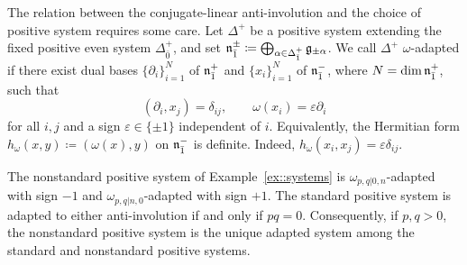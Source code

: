 The relation between the conjugate-linear anti-involution and the choice of positive system requires some care. Let $\Delta^{+}$ be a positive system extending the fixed positive even system $\Delta_{\bar0}^{+}$, and set
${\mathfrak{n}}_{\bar1}^{\pm}
\coloneqq
\bigoplus_{\alpha\in\Delta_{\bar1}^{+}}
{\mathfrak{g}}_{\pm\alpha}$. 
We call $\Delta^{+}$ $\omega$-adapted if there exist dual bases
$\{\partial_i\}_{i=1}^{N}$ of ${\mathfrak{n}}_{\bar1}^{+}$ and
$\{x_i\}_{i=1}^{N}$ of ${\mathfrak{n}}_{\bar1}^{-}$, where
$N=\dim{\mathfrak{n}}_{\bar1}^{+}$, such that
\begin{equation}
(\partial_i,x_j)=\delta_{ij},
\qquad
\omega(x_i)=\varepsilon\partial_i
\end{equation}
for all $i,j$ and a sign $\varepsilon\in\{\pm1\}$ independent of $i$. Equivalently, the Hermitian form
$
h_\omega(x,y)\coloneqq(\omega(x),y)
$
on ${\mathfrak{n}}_{\bar1}^{-}$ is definite. Indeed, $h_\omega(x_i,x_j)=\varepsilon\delta_{ij}$.

\begin{lemma}\label{lemm::adapted_systems_slmn}
The nonstandard positive system of Example~\ref{ex::systems} is
$\omega_{p,q\vert 0,n}$-adapted with sign $-1$ and
$\omega_{p,q\vert n,0}$-adapted with sign $+1$. The standard positive
system is adapted to either anti-involution if and only if $pq=0$.
Consequently, if $p,q>0$, the nonstandard positive system is the unique
adapted system among the standard and nonstandard positive systems.
\end{lemma}

